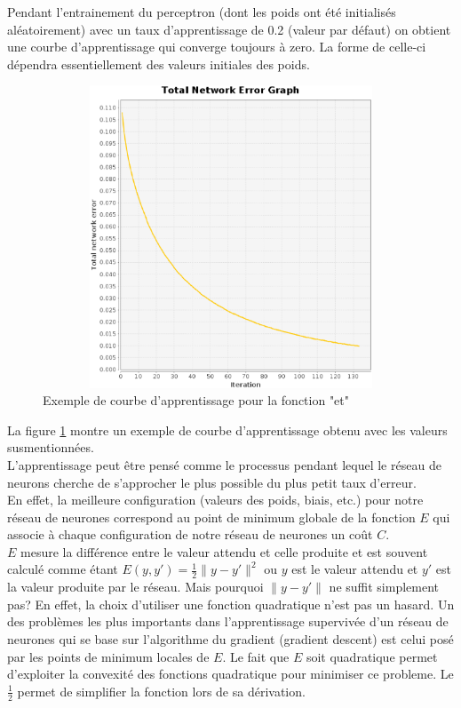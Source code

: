 \documentclass[twoside,openright,a4paper,11pt,french]{article}
\begin{document}
Pendant l'entrainement du perceptron (dont les poids ont été initialisés
aléatoirement) avec un taux d'apprentissage de 0.2 (valeur par
défaut) on obtient une courbe d'apprentissage qui converge toujours à
zero. La forme de celle-ci dépendra essentiellement des valeurs initiales des
poids. 


\begin{figure}[h]
\centering
\includegraphics[width=12cm,height=9cm]{./pics/and_error1.eps}
\caption{Exemple de courbe d'apprentissage pour la fonction "et"}
\label{fig:anderr}
\end{figure}

La figure \ref{fig:anderr} montre un exemple de courbe d'apprentissage
obtenu avec les valeurs susmentionnées.\\

L'apprentissage peut être pensé comme le processus pendant lequel le
réseau de neurons cherche de s'approcher le plus possible du plus petit
taux d'erreur.\\

En effet, la meilleure configuration (valeurs des poids, biais, etc.) pour
notre réseau de neurones correspond au point de minimum globale de la fonction
$E$ qui associe à chaque configuration de notre réseau de neurones un coût $C$.\\

$E$ mesure la différence entre le valeur attendu et celle produite et est
souvent calculé comme étant $E(y,y') = \tfrac{1}{2} \lVert y-y'\rVert^2$ ou $y$ est
le valeur attendu et $y'$ est la valeur produite par le réseau.
Mais pourquoi $\lVert y-y'\rVert$ ne suffit simplement pas? 
En effet, la choix d'utiliser une fonction quadratique n'est pas un hasard. 
Un des problèmes les plus importants dans l'apprentissage supervivée d'un réseau
de neurones qui se base sur l'algorithme du gradient (gradient descent) est
celui posé par les points de minimum locales de $E$. Le fait que $E$ soit
quadratique permet d'exploiter la convexité des fonctions quadratique pour
minimiser ce probleme. Le $\tfrac{1}{2}$ permet de simplifier la fonction lors
de sa dérivation.\\
\end{document}
